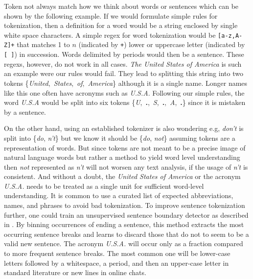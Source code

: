 Token not always match how we think about words or sentences which can be shown by the following example.
If we would formulate simple rules for tokenization, then a definition for a word would be a string enclosed by single white space characters.
A simple regex for word tokenization would be \texttt{[a-z,A-Z]+} that matches 1 to $n$ (indicated by \texttt{+}) lower or uppercase letter (indicated by \texttt{[ ]}) in succession.
Words delimited by periods would then be a sentence.
These regexs, however, do not work in all cases.
\textit{The United States of America} is such an example were our rules would fail. They lead to splitting this string into two tokens \mbox{\{\textquotesingle \textit{United}\textquotesingle, \textquotesingle \textit{States}\textquotesingle, \textquotesingle \textit{of}\textquotesingle, \textquotesingle \textit{America}\textquotesingle\}} although it is a single name.
Longer names like this one often have acronyms such as \textit{U.S.A}.
Following our simple rules, the word \textit{U.S.A} would be split into six tokens \mbox{\{\textquotesingle \textit{U}\textquotesingle, \textquotesingle \textbf{.}\textquotesingle, \textquotesingle \textit{S}\textquotesingle, \textquotesingle \textbf{.}\textquotesingle, \textquotesingle \textit{A}\textquotesingle, \textquotesingle \textbf{.}\textquotesingle\}} since it is mistaken by a sentence.

On the other hand, using an established tokenizer is also wondering e.g, \textit{don't} is split into \{\textquotesingle \textit{do}\textquotesingle, \textquotesingle \textit{n't}\textquotesingle\} but we know it should be \{\textquotesingle \textit{do}\textquotesingle, \textquotesingle \textit{not}\textquotesingle\} assuming tokens are a representation of words.
But since tokens are not meant to be a precise image of natural language words but rather a method to yield word level understanding then \textit{not} represented as \textit{n't} will not worsen any text analysis, if the usage of \textit{n't} is consistent.
And without a doubt, the \textit{United States of America} or the acronym \textit{U.S.A.} needs to be treated as a single unit for sufficient word-level understanding.
It is common to use a curated list of expected abbreviations, names, and phrases to avoid bad tokenization.
To improve sentence tokenization further, one could train an unsupervised sentence boundary detector as described in \cite{Kiss2006}.
By binning occurrences of ending a sentence, this method extracts the most occurring sentence breaks and learns to discard those that do not to seem to be a valid new sentence.
The acronym \textit{U.S.A.} will occur only as a fraction compared to more frequent sentence breaks.
The most common one will be lower-case letters followed by a whitespace, a period, and then an upper-case letter in standard literature or new lines in online chats.

